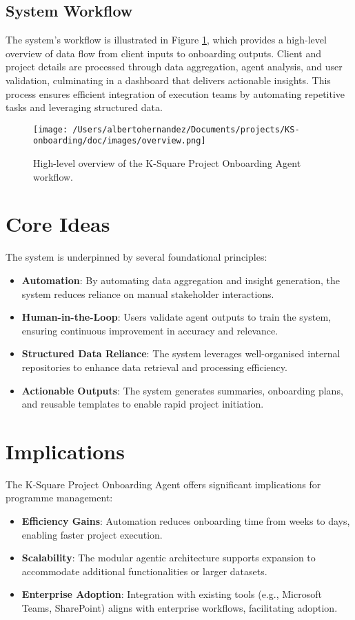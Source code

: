 \documentclass{article}
\begin{document}
\subsection{System Workflow}
The system’s workflow is illustrated in Figure \ref{fig:overview}, which provides a high-level overview of data flow from client inputs to onboarding outputs. Client and project details are processed through data aggregation, agent analysis, and user validation, culminating in a dashboard that delivers actionable insights. This process ensures efficient integration of execution teams by automating repetitive tasks and leveraging structured data.

\begin{figure}[h]
    \centering
    \texttt{[image: /Users/albertohernandez/Documents/projects/KS-onboarding/doc/images/overview.png]}
    \caption{High-level overview of the K-Square Project Onboarding Agent workflow.}
    \label{fig:overview}
\end{figure}

\section{Core Ideas}
The system is underpinned by several foundational principles:
\begin{itemize}
    \item \textbf{Automation}: By automating data aggregation and insight generation, the system reduces reliance on manual stakeholder interactions.
    \item \textbf{Human-in-the-Loop}: Users validate agent outputs to train the system, ensuring continuous improvement in accuracy and relevance.
    \item \textbf{Structured Data Reliance}: The system leverages well-organised internal repositories to enhance data retrieval and processing efficiency.
    \item \textbf{Actionable Outputs}: The system generates summaries, onboarding plans, and reusable templates to enable rapid project initiation.
\end{itemize}

\section{Implications}
The K-Square Project Onboarding Agent offers significant implications for programme management:
\begin{itemize}
    \item \textbf{Efficiency Gains}: Automation reduces onboarding time from weeks to days, enabling faster project execution.
    \item \textbf{Scalability}: The modular agentic architecture supports expansion to accommodate additional functionalities or larger datasets.
    \item \textbf{Enterprise Adoption}: Integration with existing tools (e.g., Microsoft Teams, SharePoint) aligns with enterprise workflows, facilitating adoption.
\end{itemize}
\end{document}
